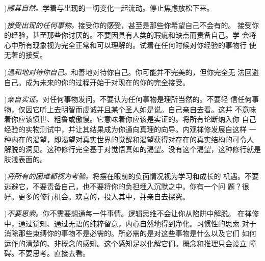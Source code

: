 ){\it 顺其自然。}学着与出现的一切变化一起流动。停止焦虑放松下来。


){\it 接受出现的任何事物。}接受你的感受，甚至是那些\1你希望自己不会有的。
接受你的经验，甚至那些你讨厌的。不要因具有人类的瑕疵和缺点而责备自己。学
会将心中所有现象视为完全正常和可以理解的。试着在任何时候对你经验的事物行
使无著的接受。

){\it 温和地对待你自己。}和善地对待你自己。你可能并不完美的，但你完全无
法回避自己。成为未来的你的过程开始于对现在的你的完全接受。

){\it 亲自实证。}对任何事物发问。不要认为任何事物是理所当然的。不要轻
信任何事物，仅因它听上去明智而虔诚并且某个圣人如是说。自己亲自去看。这并
不意味着你应该愤世、粗鲁或傲慢。它意味着你应该是实证的。将所有论断纳入你
自己经验的实物测试中，并让其结果成为你通向真理的向导。内观禅修发展自这样
一种内在的渴望，即渴望对真实世界的觉醒和渴望获得对存在的真实结构的可令人
解脱的洞见。这种修行完全基于对觉悟真如的渴望。没有这个渴望，这种修行就是
肤浅表面的。

){\it 将所有的困难都视为考验。}将摆在眼前的负面情况视为学习和成长的
机遇。不要逃避它，不要责备自己，也不要将你的负担埋入沉默之中。你有一个问
题？很好。更多的修行机会。欢喜的，投入其中，并亲自去探究。

){\it 不要思索。}你不需要想通每一件事情。逻辑思维不会让你从陷阱中解脱。
在禅修中，通过觉知、通过无语的纯粹留意，内心自然地得到净化。习惯性的思索
对于消除\1那些束缚你的事物不是必需的。所必需的是对这些事物是什么以及它们
如何运作的清楚的、非概念的感知。这个感知足以化解它们。概念和推理只会设立
障碍。不要思考。直接去看。

\endchapter

\byebye
